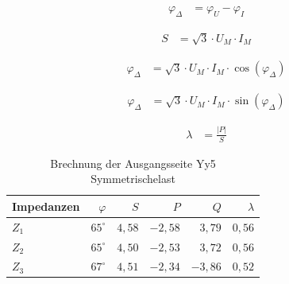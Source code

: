 \begin{enumerate}[label=\alph*)]
	      \begin{minipage}{0.5\textwidth}
		      \begin{center}
			      \begin{align*}
				      \varphi_{\Delta} & = \varphi_{U} - \varphi_{I}
			      \end{align*}
		      \end{center}
	      \end{minipage}
	      \begin{minipage}{0.5\textwidth}
		      \begin{center}
			      \begin{align*}
				      S & = \sqrt{3}\cdot U_M\cdot I_M
			      \end{align*}
		      \end{center}
	      \end{minipage}
	      \begin{minipage}{0.5\textwidth}
		      \begin{center}
			      \begin{align*}
				      \varphi_{\Delta} & = \sqrt{3}\cdot U_M\cdot I_M\cdot\cos(\varphi_{\Delta})
			      \end{align*}
		      \end{center}
	      \end{minipage}
	      \begin{minipage}{0.5\textwidth}
		      \begin{center}
			      \begin{align*}
				      \varphi_{\Delta} & = \sqrt{3}\cdot U_M\cdot I_M\cdot\sin(\varphi_{\Delta})
			      \end{align*}
		      \end{center}
	      \end{minipage}
	      \begin{center}
		      \begin{minipage}{0.5\textwidth}
			      \begin{center}
				      \begin{align*}
					      \lambda & = \frac{|P|}{S}
				      \end{align*}
			      \end{center}
		      \end{minipage}
	      \end{center}

	      \begin{table}[h!]
		      \caption{Brechnung der Ausgangsseite Yy5 Symmetrischelast}
		      \centering
		      \begin{tabular}{lrrrrr}
			      \hline
			      Impedanzen & $\varphi$    & $S$    & $P$      & $Q$      & $\lambda$ \\ \hline
			      $Z_1$      & $65  ^\circ$ & $4,58$ & $-2,58$  & $ 3,79 $ & $0,56$    \\
			      $Z_2$      & $65^\circ$   & $4,50$ & $-2,53 $ & $ 3,72$  & $0,56$    \\
			      $Z_3$      & $67^\circ  $ & $4,51$ & $-2,34$  & $ -3,86$ & $0,52$    \\ \hline
		      \end{tabular}
	      \end{table}


\end{enumerate}
